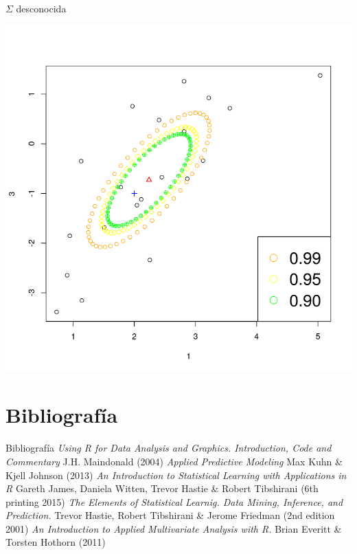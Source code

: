 \documentclass[xcolor=table]{beamer}
\begin{document}
\begin{frame}[fragile]{$\Sigma$ desconocida}

\begin{center}
\includegraphics[scale=0.4]{superficie2.png}
\end{center}
\end{frame}


\section{Bibliografía}
\begin{frame}{Bibliografía}
\textit{Using R for Data Analysis and Graphics. Introduction, Code and Commentary} J.H. Maindonald (2004)
\newline
\newline
\textit{Applied Predictive Modeling} Max Kuhn \& Kjell Johnson (2013)
\newline
\newline
\textit{An Introduction to Statistical Learning with Applications in R} Gareth James, Daniela Witten, Trevor Hastie \& Robert Tibshirani (6th printing 2015)
\newline
\newline
\textit{The Elements of Statistical Learnig. Data Mining, Inference, and Prediction.} Trevor Hastie, Robert Tibshirani \& Jerome Friedman (2nd edition 2001)
\newline
\newline
\textit{An Introduction to Applied Multivariate Analysis with R.} Brian Everitt \& Torsten Hothorn (2011)
\end{frame}
\end{document}
